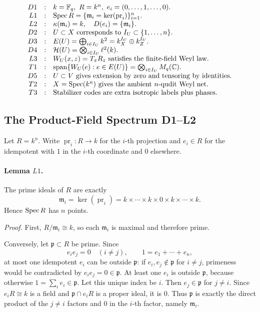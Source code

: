 \[
\begin{array}{rcl}
D1&:&k=\mathbb F_q,\ R=k^n,\ e_i=(0,\ldots,1,\ldots,0).\\
L1&:&\operatorname{Spec}R=\{\mathfrak m_i=\ker(\operatorname{pr}_i)\}_{i=1}^n.\\
L2&:&\kappa(\mathfrak m_i)=k,\quad D(e_i)=\{\mathfrak m_i\}.\\
D2&:&U\subset X\text{ corresponds to }I_U\subset\{1,\ldots,n\}.\\
D3&:&E(U)=\bigoplus_{i\in I_U}k^2
      =k_X^{I_U}\oplus k_Z^{I_U}.\\
D4&:&\mathcal H(U)=\bigotimes_{i\in I_U}\ell^2(k).\\
L3&:&W_U(x,z)=T_xR_z\text{ satisfies the finite-field Weyl law}.\\
T1&:&\operatorname{span}\{W_U(e):e\in E(U)\}
      =\bigotimes_{i\in I_U}M_q(\mathbb C).\\
D5&:&U\subset V\text{ gives extension by zero and tensoring by identities}.\\
T2&:&X=\operatorname{Spec}(k^n)\text{ gives the ambient }n\text{-qudit Weyl net}.\\
T3&:&\text{Stabilizer codes are extra isotropic labels plus phases.}
\end{array}
\]

\subsection{The Product-Field Spectrum D1--L2}

Let \(R=k^n\).  Write \(\operatorname{pr}_i:R\to k\) for the \(i\)-th
projection and \(e_i\in R\) for the idempotent with \(1\) in the \(i\)-th
coordinate and \(0\) elsewhere.

\paragraph{Lemma \(L1\).}
The prime ideals of \(R\) are exactly
\[
  \mathfrak m_i=\ker(\operatorname{pr}_i)
  =
  k\times\cdots\times k\times0\times k\times\cdots\times k .
\]
Hence \(\operatorname{Spec} R\) has \(n\) points.

\emph{Proof.}
First, \(R/\mathfrak m_i\cong k\), so each \(\mathfrak m_i\) is maximal and
therefore prime.

Conversely, let \(\mathfrak p\subset R\) be prime.  Since
\[
  e_ie_j=0\quad (i\ne j),\qquad 1=e_1+\cdots+e_n,
\]
at most one idempotent \(e_i\) can be outside \(\mathfrak p\): if
\(e_i,e_j\notin\mathfrak p\) for \(i\ne j\), primeness would be contradicted
by \(e_ie_j=0\in\mathfrak p\).  At least one \(e_i\) is outside
\(\mathfrak p\), because otherwise \(1=\sum_ie_i\in\mathfrak p\).  Let this
unique index be \(i\).  Then \(e_j\in\mathfrak p\) for \(j\ne i\).  Since
\(e_iR\cong k\) is a field and \(\mathfrak p\cap e_iR\) is a proper ideal, it
is \(0\).  Thus \(\mathfrak p\) is exactly the direct product of the
\(j\ne i\) factors and \(0\) in the \(i\)-th factor, namely
\(\mathfrak m_i\).

